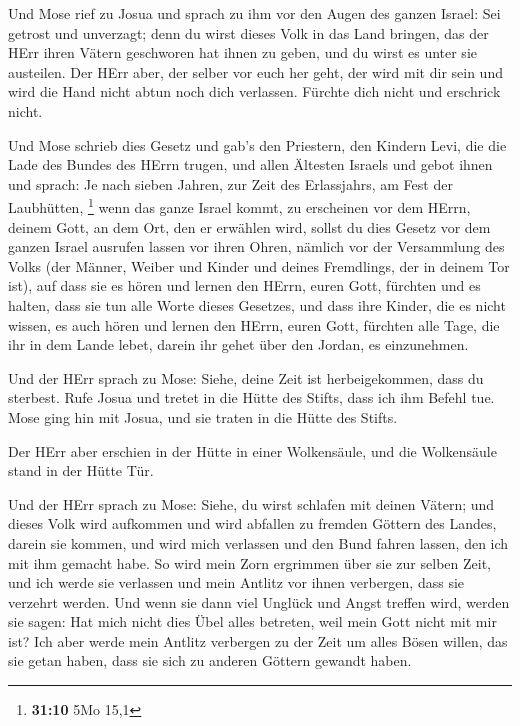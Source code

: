  Und Mose rief zu Josua und sprach zu ihm vor den Augen des
ganzen Israel: Sei getrost und unverzagt; denn du wirst dieses Volk in
das Land bringen, das der HErr ihren Vätern geschworen hat ihnen zu
geben, und du wirst es unter sie austeilen.  Der HErr aber,
der selber vor euch her geht, der wird mit dir sein und wird die Hand
nicht abtun noch dich verlassen. Fürchte dich nicht und erschrick nicht.

 Und Mose schrieb dies Gesetz und gab's den Priestern, den
Kindern Levi, die die Lade des Bundes des HErrn trugen, und allen
Ältesten Israels  und gebot ihnen und sprach: Je nach
sieben Jahren, zur Zeit des Erlassjahrs, am Fest der Laubhütten,
\footnote{\textbf{31:10} 5Mo 15,1}  wenn das ganze Israel
kommt, zu erscheinen vor dem HErrn, deinem Gott, an dem Ort, den er
erwählen wird, sollst du dies Gesetz vor dem ganzen Israel ausrufen
lassen vor ihren Ohren,  nämlich vor der Versammlung des
Volks (der Männer, Weiber und Kinder und deines Fremdlings, der in
deinem Tor ist), auf dass sie es hören und lernen den HErrn, euren Gott,
fürchten und es halten, dass sie tun alle Worte dieses Gesetzes,
 und dass ihre Kinder, die es nicht wissen, es auch hören
und lernen den HErrn, euren Gott, fürchten alle Tage, die ihr in dem
Lande lebet, darein ihr gehet über den Jordan, es einzunehmen.

 Und der HErr sprach zu Mose: Siehe, deine Zeit ist
herbeigekommen, dass du sterbest. Rufe Josua und tretet in die Hütte des
Stifts, dass ich ihm Befehl tue. Mose ging hin mit Josua, und sie traten
in die Hütte des Stifts.

 Der HErr aber erschien in der Hütte in einer Wolkensäule,
und die Wolkensäule stand in der Hütte Tür.

 Und der HErr sprach zu Mose: Siehe, du wirst schlafen mit
deinen Vätern; und dieses Volk wird aufkommen und wird abfallen zu
fremden Göttern des Landes, darein sie kommen, und wird mich verlassen
und den Bund fahren lassen, den ich mit ihm gemacht habe. 
So wird mein Zorn ergrimmen über sie zur selben Zeit, und ich werde sie
verlassen und mein Antlitz vor ihnen verbergen, dass sie verzehrt
werden. Und wenn sie dann viel Unglück und Angst treffen wird, werden
sie sagen: Hat mich nicht dies Übel alles betreten, weil mein Gott nicht
mit mir ist?  Ich aber werde mein Antlitz verbergen zu der
Zeit um alles Bösen willen, das sie getan haben, dass sie sich zu
anderen Göttern gewandt haben.

